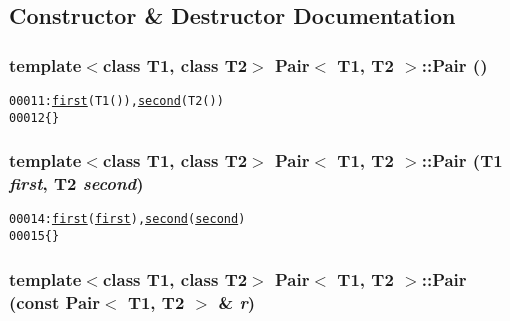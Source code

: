 \subsection{Constructor \& Destructor Documentation}
\hypertarget{class_pair_afdbbd798262302838fcf7ce963b8182b}{
\subsubsection[{Pair}]{\setlength{\rightskip}{0pt plus 5cm}template$<$class T1, class T2$>$ {\bf Pair}$<$ T1, T2 $>$::{\bf Pair} ()}}
\label{class_pair_afdbbd798262302838fcf7ce963b8182b}




\begin{footnotesize}\begin{alltt}
00011                : \hyperlink{class_pair_a3b0b4ac2336a2228fa2af5ceebe31804}{first}(T1()), \hyperlink{class_pair_af56592579c6ce0d7e03bad0fcaa5d93e}{second}(T2())
00012         \{\}
\end{alltt}\end{footnotesize}


\hypertarget{class_pair_acd296016a9da2ebd34c6e582bf9bc687}{
\subsubsection[{Pair}]{\setlength{\rightskip}{0pt plus 5cm}template$<$class T1, class T2$>$ {\bf Pair}$<$ T1, T2 $>$::{\bf Pair} (T1 {\em first}, \/  T2 {\em second})}}
\label{class_pair_acd296016a9da2ebd34c6e582bf9bc687}




\begin{footnotesize}\begin{alltt}
00014                                   : \hyperlink{class_pair_a3b0b4ac2336a2228fa2af5ceebe31804}{first}(\hyperlink{class_pair_a3b0b4ac2336a2228fa2af5ceebe31804}{first}), \hyperlink{class_pair_af56592579c6ce0d7e03bad0fcaa5d93e}{second}(\hyperlink{class_pair_af56592579c6ce0d7e03bad0fcaa5d93e}{second})
00015         \{\}
\end{alltt}\end{footnotesize}


\hypertarget{class_pair_a2067d5333367a0cbc5a3dc6deffaab33}{
\subsubsection[{Pair}]{\setlength{\rightskip}{0pt plus 5cm}template$<$class T1, class T2$>$ {\bf Pair}$<$ T1, T2 $>$::{\bf Pair} (const {\bf Pair}$<$ T1, T2 $>$ \& {\em r})}}
\label{class_pair_a2067d5333367a0cbc5a3dc6deffaab33}




